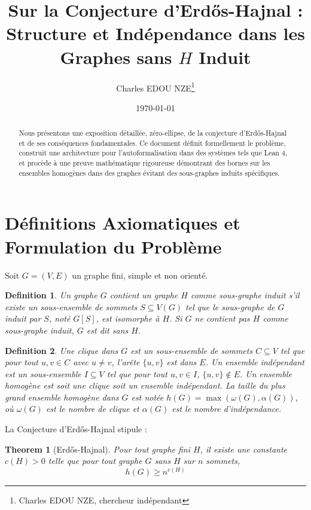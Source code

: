 \documentclass[12pt, a4paper]{article}
\title{Sur la Conjecture d'Erd\H{o}s-Hajnal : Structure et Indépendance dans les Graphes sans $H$ Induit}
\author{Charles EDOU NZE\thanks{Charles EDOU NZE, chercheur indépendant}}
\date{\today}
\newtheorem{theorem}{Theorem}
\newtheorem{definition}{Definition}
\begin{document}
\maketitle

\begin{abstract}
Nous présentons une exposition détaillée, zéro-ellipse, de la conjecture d'Erd\H{o}s-Hajnal et de ses conséquences fondamentales. Ce document définit formellement le problème, construit une architecture pour l'autoformalisation dans des systèmes tels que Lean 4, et procède à une preuve mathématique rigoureuse démontrant des bornes sur les ensembles homogènes dans des graphes évitant des sous-graphes induits spécifiques.
\end{abstract}

\tableofcontents
\newpage

\section{Définitions Axiomatiques et Formulation du Problème}

Soit $G = (V, E)$ un graphe fini, simple et non orienté.

\begin{definition}
Un graphe $G$ contient un graphe $H$ comme sous-graphe induit s'il existe un sous-ensemble de sommets $S \subseteq V(G)$ tel que le sous-graphe de $G$ induit par $S$, noté $G[S]$, est isomorphe à $H$. Si $G$ ne contient pas $H$ comme sous-graphe induit, $G$ est dit sans $H$.
\end{definition}

\begin{definition}
Une clique dans $G$ est un sous-ensemble de sommets $C \subseteq V$ tel que pour tout $u, v \in C$ avec $u \neq v$, l'arête $\{u, v\}$ est dans $E$. Un ensemble indépendant est un sous-ensemble $I \subseteq V$ tel que pour tout $u, v \in I$, $\{u, v\} \notin E$. Un ensemble homogène est soit une clique soit un ensemble indépendant. La taille du plus grand ensemble homogène dans $G$ est notée $h(G) = \max(\omega(G), \alpha(G))$, où $\omega(G)$ est le nombre de clique et $\alpha(G)$ est le nombre d'indépendance.
\end{definition}

La Conjecture d'Erd\H{o}s-Hajnal stipule :

\begin{theorem}[Erd\H{o}s-Hajnal]
Pour tout graphe fini $H$, il existe une constante $c(H) > 0$ telle que pour tout graphe $G$ sans $H$ sur $n$ sommets,
\begin{equation}
h(G) \geq n^{c(H)}
\end{equation}
\end{theorem}
\end{document}
